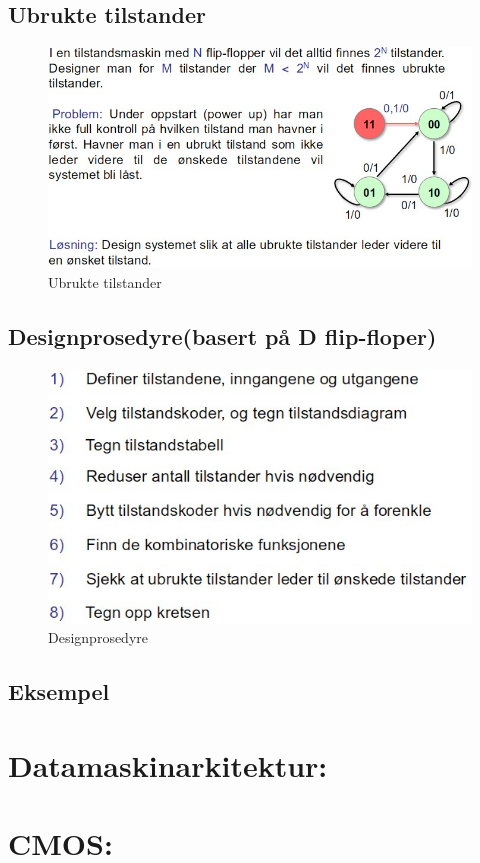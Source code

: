 \documentclass{article}
\begin{document}
	\subsection*{Ubrukte tilstander}
	\begin{figure}[H]
		\includegraphics[scale = 0.6]{ubrukt.jpg}
		\caption{Ubrukte tilstander}
	\end{figure}
	
	\subsection*{Designprosedyre(basert på D flip-floper)}
	\begin{figure}[H]
		\includegraphics[scale = 0.6]{prosedyre.jpg}
		\caption{Designprosedyre}
	\end{figure}
	
	\subsection*{Eksempel}
	
	\section*{Datamaskinarkitektur:}
	
	\section*{CMOS:}
		
			
\end{document}
